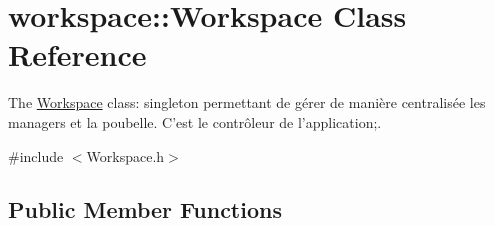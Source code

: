 \hypertarget{classworkspace_1_1_workspace}{\section{workspace\-:\-:Workspace Class Reference}
\label{classworkspace_1_1_workspace}
}


The \hyperlink{classworkspace_1_1_workspace}{Workspace} class\-: singleton permettant de gérer de manière centralisée les managers et la poubelle. C'est le contrôleur de l'application;.  




{\ttfamily \#include $<$Workspace.\-h$>$}

\subsection*{Public Member Functions}
